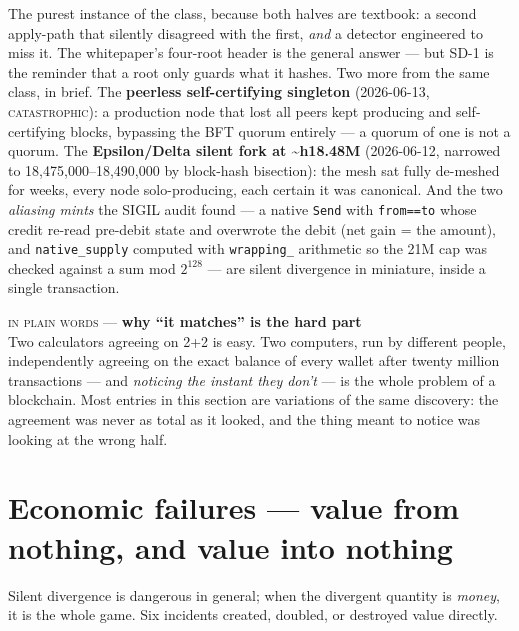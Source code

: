 \documentclass[10pt,a4paper]{article}
\newcommand{\svC}{{\scriptsize\textcolor{sigilred}{\textsc{catastrophic}}}}
\newcommand{\layman}[3]{%
\begin{tcolorbox}[enhanced,
  interior style={left color=#1!9,right color=white},
  colframe=#1!45!slate,boxrule=0.5pt,arc=3pt,
  borderline west={2.5pt}{0pt}{#1},
  left=9pt,right=9pt,top=7pt,bottom=7pt]
{\scriptsize\textcolor{#1}{\textsc{in plain words}}\; — \;\textbf{\small #2}}\\[3pt]
\small #3
\end{tcolorbox}}
\begin{document}
The purest instance of the class, because both halves are textbook: a second apply-path
that silently disagreed with the first, \emph{and} a detector engineered to miss it. The
whitepaper's four-root header is the general answer — but SD-1 is the reminder that a root
only guards what it hashes. Two more from the same class, in brief. The
\textbf{peerless self-certifying singleton} (2026-06-13, \svC): a production node that
lost all peers kept producing and self-certifying blocks, bypassing the BFT quorum
entirely — a quorum of one is not a quorum. The \textbf{Epsilon/Delta silent fork at
\textasciitilde h18.48M} (2026-06-12, narrowed to 18{,}475{,}000--18{,}490{,}000 by
block-hash bisection): the mesh sat fully de-meshed for weeks, every node solo-producing,
each certain it was canonical. And the two \emph{aliasing mints} the SIGIL audit found —
a native \texttt{Send} with \texttt{from==to} whose credit re-read pre-debit state and
overwrote the debit (net gain = the amount), and \texttt{native\_supply} computed with
\texttt{wrapping\_} arithmetic so the 21M cap was checked against a sum mod $2^{128}$ —
are silent divergence in miniature, inside a single transaction.

\layman{sigilcyan}{why ``it matches'' is the hard part}{Two calculators agreeing on
2+2 is easy. Two computers, run by different people, independently agreeing on the exact
balance of every wallet after twenty million transactions — and \emph{noticing the
instant they don't} — is the whole problem of a blockchain. Most entries in this section
are variations of the same discovery: the agreement was never as total as it looked, and
the thing meant to notice was looking at the wrong half.}

\section{Economic failures — value from nothing, and value into nothing}\label{sec:economic}

Silent divergence is dangerous in general; when the divergent quantity is \emph{money},
it is the whole game. Six incidents created, doubled, or destroyed value directly.
\end{document}
